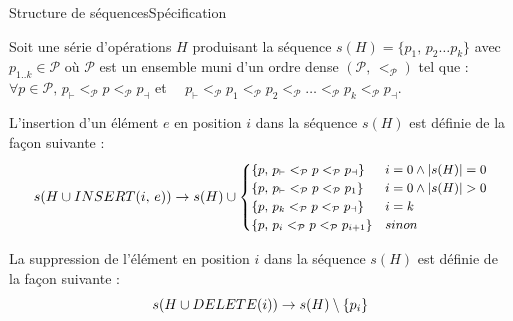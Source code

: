 \begin{frame}{Structure de séquences}{Spécification}
  \begin{definition}
  Soit une série d'opérations $H$ produisant la séquence
  $s(H) = \{p_1,\, p_2 \ldots p_k\}$ avec $p_{1..k} \in \mathcal{P}$ où
  $\mathcal{P}$ est un ensemble muni d'un ordre
  dense $(\mathcal{P},\,<_\mathcal{P})$ tel que : \\
  $\forall p\in\mathcal{P},\, p_\vdash <_\mathcal{P} p <_\mathcal{P} p_\dashv $
  \hfill et \ \
  $p_\vdash <_\mathcal{P} p_1 <_\mathcal{P} p_2 <_\mathcal{P} \ldots
  <_\mathcal{P} p_k <_\mathcal{P} p_\dashv$.
  
  \vspace{0.25cm}

  \noindent L'insertion d'un élément $e$ en position $i$ dans la séquence $s(H)$
  est définie de la façon suivante :
  \begin{equation}
    \small
    s(H \cup INSERT(i,\, e)) \rightarrow s(H) \cup 
    \begin{cases}
      \{p,\, p_\vdash <_\mathcal{P} p <_\mathcal{P} p_\dashv \} & i = 0 \wedge |s(H)| = 0\\
      \{p,\, p_\vdash <_\mathcal{P} p <_\mathcal{P} p_1 \} & i = 0 \wedge |s(H)|>0\\
      \{p,\, p_k <_\mathcal{P} p <_\mathcal{P} p_\dashv \} & i = k\\
      \{p,\, p_i <_\mathcal{P} p <_\mathcal{P} p_{i+1} \} & sinon
    \end{cases}
  \end{equation}

  \noindent La suppression de l'élément en position $i$ dans la séquence $s(H)$
  est définie de la façon suivante :
  \begin{equation}
    \small
    s(H \cup DELETE(i)) \rightarrow s(H) \setminus \{ p_i \}
  \end{equation}
\end{definition}
\end{frame}


